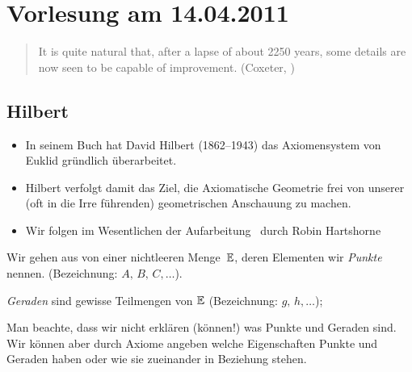 \section*{Vorlesung am 14.04.2011}

\begin{quote}
It is quite natural that, after a lapse of about 2250 years, some
details are now seen to be capable of improvement.
(Coxeter, \cite[Section 1.2]{coxeter-1969})
\end{quote}

\subsection*{Hilbert}

\begin{itemize}
\item In seinem Buch \cite{hilbert} hat David Hilbert (1862--1943) 
das Axiomensystem von Euklid gründlich überarbeitet.

\item Hilbert verfolgt damit das Ziel, die Axiomatische Geometrie frei
  von unserer (oft in die Irre führenden) geometrischen Anschauung zu machen.

\item Wir folgen im Wesentlichen der Aufarbeitung~\cite{hartshorne-2000} durch Robin
  Hartshorne

\end{itemize}






Wir gehen aus von einer nichtleeren Menge~$\mathbb E$, deren Elementen wir 
{\em Punkte} nennen. (Bezeichnung: $A,\,B,\,C,\ldots$).

{\em Geraden} sind gewisse Teilmengen von $\mathbb E$
(Bezeichnung: $g,\,h,\ldots$);

Man beachte, dass wir nicht erklären (können!) \glqq was Punkte und Geraden
sind\grqq . Wir können aber durch 
Axiome angeben welche Eigenschaften 
Punkte und Geraden haben oder wie sie zueinander in Beziehung stehen.

